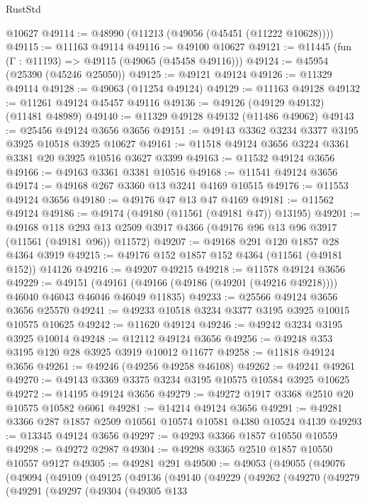 \begin{lexlean}{RustStd}
\begin{coremodule}
    @10627
@49114 := @48990 (@11213 (@49056 (@45451 (@11222 @10628))))
@49115 := @11163 @49114
@49116 := @49100 @10627
@49121 := @11445 (fun (Γ : @11193) => @49115 (@49065 (@45458 @49116)))
@49124 := @45954 (@25390 (@45246 @25050))
@49125 := @49121 @49124
@49126 := @11329 @49114
@49128 := @49063 (@11254 @49124)
@49129 := @11163 @49128
@49132 := @11261 @49124 @45457 @49116
@49136 := @49126 (@49129 @49132) (@11481 @48989)
@49140 := @11329 @49128 @49132 (@11486 @49062)
@49143 := @25456 @49124 @3656 @3656
@49151 := @49143 @3362 @3234 @3377 @3195 @3925 @10518 @3925 @10627
@49161 := @11518 @49124 @3656 @3224 @3361 @3381 @20 @3925 @10516 @3627 @3399
@49163 := @11532 @49124 @3656
@49166 := @49163 @3361 @3381 @10516
@49168 := @11541 @49124 @3656
@49174 := @49168 @267 @3360 @13 @3241 @4169 @10515
@49176 := @11553 @49124 @3656
@49180 := @49176 @47 @13 @47 @4169
@49181 := @11562 @49124
@49186 := @49174 (@49180 (@11561 (@49181 @47)) @13195)
@49201 := @49168
    @118
    @293
    @13
    @2509
    @3917
    @4366
    (@49176 @96 @13 @96 @3917 (@11561 (@49181 @96)) @11572)
@49207 := @49168 @291 @120 @1857 @28 @4364 @3919
@49215 := @49176 @152 @1857 @152 @4364 (@11561 (@49181 @152)) @14126
@49216 := @49207 @49215
@49218 := @11578 @49124 @3656
@49229 := @49151
    (@49161 (@49166 (@49186 (@49201 (@49216 @49218)))) @46040 @46043 @46046 @46049 @11835)
@49233 := @25566 @49124 @3656 @3656 @25570
@49241 := @49233 @10518 @3234 @3377 @3195 @3925 @10015 @10575 @10625
@49242 := @11620 @49124
@49246 := @49242 @3234 @3195 @3925 @10014
@49248 := @12112 @49124 @3656
@49256 := @49248 @353 @3195 @120 @28 @3925 @3919 @10012 @11677
@49258 := @11818 @49124 @3656
@49261 := @49246 (@49256 @49258 @46108)
@49262 := @49241 @49261
@49270 := @49143 @3369 @3375 @3234 @3195 @10575 @10584 @3925 @10625
@49272 := @14195 @49124 @3656
@49279 := @49272 @1917 @3368 @2510 @20 @10575 @10582 @6061
@49281 := @14214 @49124 @3656
@49291 := @49281 @3366 @287 @1857 @2509 @10561 @10574 @10581 @4380 @10524 @4139
@49293 := @13345 @49124 @3656
@49297 := @49293 @3366 @1857 @10550 @10559
@49298 := @49272 @2987
@49304 := @49298 @3365 @2510 @1857 @10550 @10557 @9127
@49305 := @49281 @291
@49500 := @49053
    (@49055
      (@49076
        (@49094
          (@49109
            (@49125
              (@49136
                (@49140
                  (@49229
                    (@49262
                      (@49270
                        (@49279
                          (@49291
                            (@49297
                              (@49304
                                (@49305
                                  @133

\end{coremodule}
\end{lexlean}
